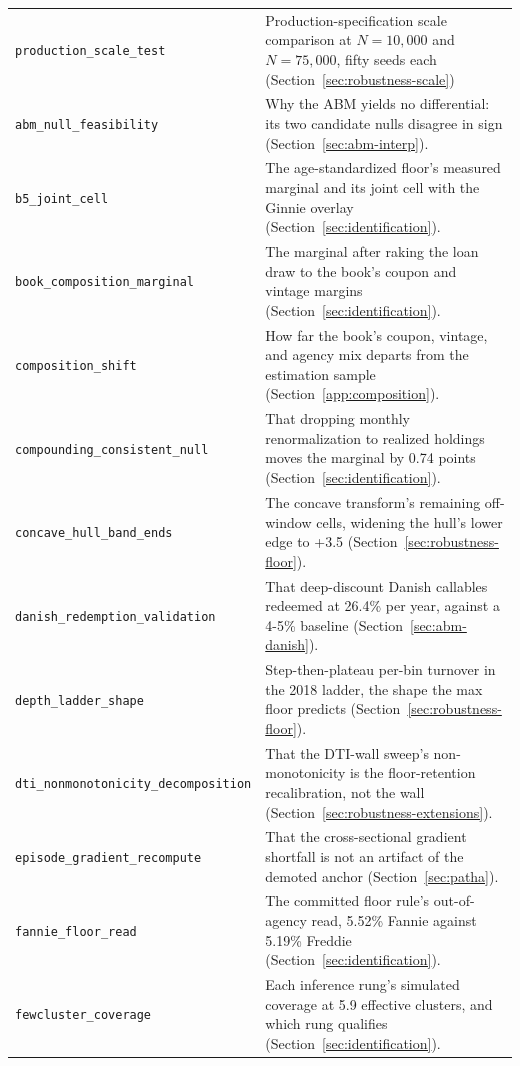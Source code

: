 \documentclass[12pt]{article}
\begin{document}
{\begin{longtable}{@{}p{5.4cm}p{8.8cm}@{}}
\texttt{production\_scale\_test} & Production-specification scale comparison at $N = 10{,}000$ and $N = 75{,}000$, fifty seeds each (Section~\ref{sec:robustness-scale}) \\
\texttt{abm\_null\_feasibility} & Why the ABM yields no differential: its two candidate nulls disagree in sign (Section~\ref{sec:abm-interp}). \\
\texttt{b5\_joint\_cell} & The age-standardized floor's measured marginal and its joint cell with the Ginnie overlay (Section~\ref{sec:identification}). \\
\texttt{book\_composition\_marginal} & The marginal after raking the loan draw to the book's coupon and vintage margins (Section~\ref{sec:identification}). \\
\texttt{composition\_shift} & How far the book's coupon, vintage, and agency mix departs from the estimation sample (Section~\ref{app:composition}). \\
\texttt{compounding\_consistent\_null} & That dropping monthly renormalization to realized holdings moves the marginal by 0.74 points (Section~\ref{sec:identification}). \\
\texttt{concave\_hull\_band\_ends} & The concave transform's remaining off-window cells, widening the hull's lower edge to +3.5 (Section~\ref{sec:robustness-floor}). \\
\texttt{danish\_redemption\_validation} & That deep-discount Danish callables redeemed at 26.4\% per year, against a 4-5\% baseline (Section~\ref{sec:abm-danish}). \\
\texttt{depth\_ladder\_shape} & Step-then-plateau per-bin turnover in the 2018 ladder, the shape the max floor predicts (Section~\ref{sec:robustness-floor}). \\
\texttt{dti\_nonmonotonicity\_decomposition} & That the DTI-wall sweep's non-monotonicity is the floor-retention recalibration, not the wall (Section~\ref{sec:robustness-extensions}). \\
\texttt{episode\_gradient\_recompute} & That the cross-sectional gradient shortfall is not an artifact of the demoted anchor (Section~\ref{sec:patha}). \\
\texttt{fannie\_floor\_read} & The committed floor rule's out-of-agency read, 5.52\% Fannie against 5.19\% Freddie (Section~\ref{sec:identification}). \\
\texttt{fewcluster\_coverage} & Each inference rung's simulated coverage at 5.9 effective clusters, and which rung qualifies (Section~\ref{sec:identification}). \\

\end{longtable}}
\end{document}
